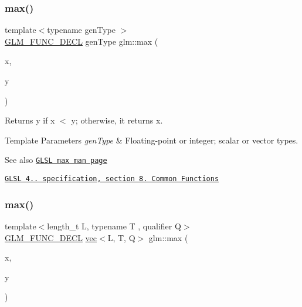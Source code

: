 \subsubsection{\texorpdfstring{max()}{max()}\hspace{0.1cm}{\footnotesize\ttfamily [1/3]}}
{\footnotesize\ttfamily template$<$typename gen\+Type $>$ \\
\hyperlink{setup_8hpp_ab2d052de21a70539923e9bcbf6e83a51}{G\+L\+M\+\_\+\+F\+U\+N\+C\+\_\+\+D\+E\+CL} gen\+Type glm\+::max (\begin{DoxyParamCaption}\item[{gen\+Type}]{x,  }\item[{gen\+Type}]{y }\end{DoxyParamCaption})}

Returns y if x $<$ y; otherwise, it returns x.


\begin{DoxyTemplParams}{Template Parameters}
{\em gen\+Type} & Floating-\/point or integer; scalar or vector types.\\
\hline
\end{DoxyTemplParams}
\begin{DoxySeeAlso}{See also}
\href{http://www.opengl.org/sdk/docs/manglsl/xhtml/max.xml}{\tt G\+L\+SL max man page} 

\href{http://www.opengl.org/registry/doc/GLSLangSpec.4.20.8.pdf}{\tt G\+L\+SL 4.. specification, section 8. Common Functions} 
\end{DoxySeeAlso}
\mbox{\label{group__core__func__common_gae8b0964d30deabd0867b8d7ac44f067e}} 
\subsubsection{\texorpdfstring{max()}{max()}\hspace{0.1cm}{\footnotesize\ttfamily [2/3]}}
{\footnotesize\ttfamily template$<$length\+\_\+t L, typename T , qualifier Q$>$ \\
\hyperlink{setup_8hpp_ab2d052de21a70539923e9bcbf6e83a51}{G\+L\+M\+\_\+\+F\+U\+N\+C\+\_\+\+D\+E\+CL} \hyperlink{structglm_1_1vec}{vec}$<$L, T, Q$>$ glm\+::max (\begin{DoxyParamCaption}\item[{\hyperlink{structglm_1_1vec}{vec}$<$ L, T, Q $>$ const \&}]{x,  }\item[{T}]{y }\end{DoxyParamCaption})}

